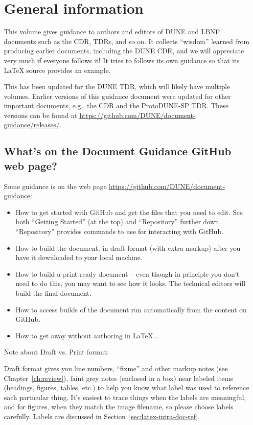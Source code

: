 \chapter{General information}
\label{ch:gen}

This volume gives guidance to authors and editors of DUNE and LBNF documents such as the CDR, TDRs, and so on. It collects ``wisdom'' learned from 
producing earlier documents, including the DUNE CDR, and we will appreciate 
very much if everyone follows it!  It tries to follows its own guidance so that its \LaTeX{} source
provides an example.  

This has been updated for the DUNE TDR, which will likely have multiple volumes. Earlier versions of this guidance document were updated for other important documents, e.g., the CDR and the ProtoDUNE-SP TDR.  These versions can be found at \url{https://github.com/DUNE/document-guidance/releases/}.


\section{What's on the Document Guidance GitHub web page?}
\label{sec:gen-webpage}

Some guidance is on the web page \url{https://github.com/DUNE/document-guidance}:

\begin{itemize}
\item How to get started with GitHub and get the files that you need to edit. See both ``Getting Started'' (at the top) and ``Repository'' further down.  ``Repository'' provides commands to use for interacting with GitHub.
\item How to build the document, in draft format (with extra markup) after you have it downloaded to your local machine.
\item How to build a print-ready document -- even though in principle you don't need to do this, you may want to see how it looks. The technical editors will build the final document.
\item How to access builds of the document run automatically from the content on GitHub.
\item How to get away without authoring in \LaTeX{}...
\end{itemize}

Note about Draft vs. Print format: 

Draft format gives you line numbers, ``fixme'' and other markup notes (see Chapter~\ref{ch:review}), 
faint grey notes (enclosed in a box) near labeled items (headings, figures, tables, etc.) to help you know 
what label was used to reference each particular thing.  
It's easiest to trace things when the labels are meaningful, and for figures, when they match the image filename, so please choose labels carefully. Labels are discussed in Section~\ref{sec:latex-intra-doc-ref}.

